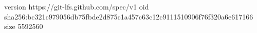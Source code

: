 version https://git-lfs.github.com/spec/v1
oid sha256:bc321c979056db75fbde2d875c1a457c63c12c9111510906f76f320a6e617166
size 5592560
